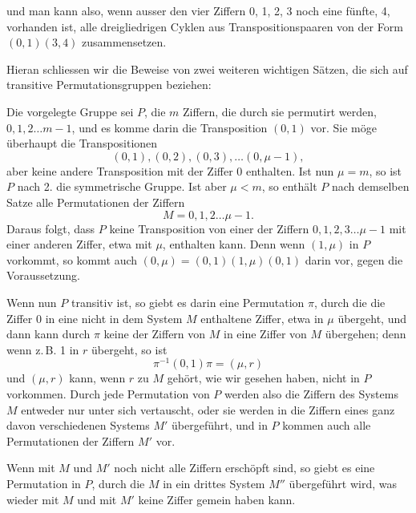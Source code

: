 und man kann also, wenn ausser den vier Ziffern 0, 1, 2, 3 noch eine fünfte, 4, vorhanden ist, alle dreigliedrigen Cyklen aus Transpositionspaaren von der Form $(0, 1)(3, 4)$ zusammensetzen.

Hieran schliessen wir die Beweise von zwei weiteren wichtigen Sätzen, die sich auf transitive Permutationsgruppen beziehen:


Die vorgelegte Gruppe sei $P$, die $m$ Ziffern, die durch sie permutirt werden, $0, 1, 2 \dots m - 1$, und es komme darin die Transposition $(0, 1)$ vor. Sie möge überhaupt die Transpositionen
\[
(0, 1), (0, 2), (0, 3), \dots (0, \mu - 1),
\]
aber keine andere Transposition mit der Ziffer 0 enthalten. Ist nun $\mu = m$, so ist $P$ nach 2. die symmetrische Gruppe. Ist aber $\mu < m$, so enthält $P$ nach demselben Satze alle Permutationen der Ziffern
\[
M = 0, 1, 2 \dots \mu - 1.
\]
Daraus folgt, dass $P$ keine Transposition von einer der Ziffern $0, 1, 2, 3 \dots \mu - 1$ mit einer anderen Ziffer, etwa mit $\mu$, enthalten kann. Denn wenn $(1, \mu)$ in $P$ vorkommt, so kommt auch $(0, \mu) = (0, 1)(1, \mu)(0, 1)$ darin vor, gegen die Voraussetzung.

Wenn nun $P$ transitiv ist, so giebt es darin eine Permutation $\pi$, durch die die Ziffer 0 in eine nicht in dem System $M$ enthaltene Ziffer, etwa in $\mu$ übergeht, und dann kann durch $\pi$ keine der Ziffern von $M$ in eine Ziffer von $M$ übergehen; denn wenn z.\,B. 1 in $r$ übergeht, so ist
\[
\pi^{-1}(0, 1)\pi = (\mu, r)
\]
und $(\mu, r)$ kann, wenn $r$ zu $M$ gehört, wie wir gesehen haben, nicht in $P$ vorkommen. Durch jede Permutation von $P$ werden also die Ziffern des Systems $M$ entweder nur unter sich vertauscht, oder sie werden in die Ziffern eines ganz davon verschiedenen Systems $M'$ übergeführt, und in $P$ kommen auch alle Permutationen der Ziffern $M'$ vor.

Wenn mit $M$ und $M'$ noch nicht alle Ziffern erschöpft sind, so giebt es eine Permutation in $P$, durch die $M$ in ein drittes System $M''$ übergeführt wird, was wieder mit $M$ und mit $M'$ keine Ziffer gemein haben kann.
